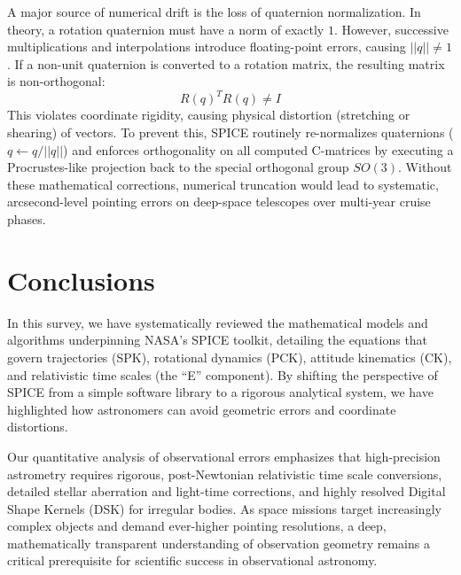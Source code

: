 \documentclass{acta}
\begin{document}
A major source of numerical drift is the loss of quaternion normalization. In theory, a rotation quaternion must have a norm of exactly $1$. However, successive multiplications and interpolations introduce floating-point errors, causing $||q|| \neq 1$. If a non-unit quaternion is converted to a rotation matrix, the resulting matrix is non-orthogonal:
\begin{equation}
R(q)^T R(q) \neq I
\end{equation}
This violates coordinate rigidity, causing physical distortion (stretching or shearing) of vectors. To prevent this, SPICE routinely re-normalizes quaternions ($q \leftarrow q/||q||$) and enforces orthogonality on all computed C-matrices by executing a Procrustes-like projection back to the special orthogonal group $SO(3)$. Without these mathematical corrections, numerical truncation would lead to systematic, arcsecond-level pointing errors on deep-space telescopes over multi-year cruise phases.

\section{Conclusions}
In this survey, we have systematically reviewed the mathematical models and algorithms underpinning NASA's SPICE toolkit, detailing the equations that govern trajectories (SPK), rotational dynamics (PCK), attitude kinematics (CK), and relativistic time scales (the ``E'' component). By shifting the perspective of SPICE from a simple software library to a rigorous analytical system, we have highlighted how astronomers can avoid geometric errors and coordinate distortions.

Our quantitative analysis of observational errors emphasizes that high-precision astrometry requires rigorous, post-Newtonian relativistic time scale conversions, detailed stellar aberration and light-time corrections, and highly resolved Digital Shape Kernels (DSK) for irregular bodies. As space missions target increasingly complex objects and demand ever-higher pointing resolutions, a deep, mathematically transparent understanding of observation geometry remains a critical prerequisite for scientific success in observational astronomy.

\end{document}
